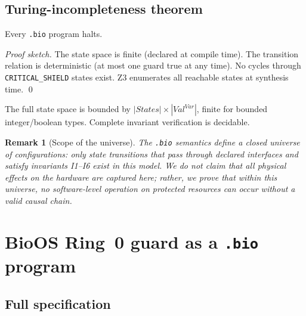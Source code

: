 \documentclass[11pt,a4paper,twoside]{article}
\newcommand{\tm}[1]{\texttt{#1}}
\newtheorem*{remark}{Remark}
\begin{document}
\subsection{Turing-incompleteness theorem}

\begin{theorem}[Termination]\label{thm:termination}
Every \texttt{.bio} program halts.
\end{theorem}
\begin{proof}[Proof sketch]
The state space is finite (declared at compile time). The transition relation is
deterministic (at most one guard true at any time). No cycles through
\tm{CRITICAL\_SHIELD} states exist. Z3 enumerates all reachable states at
synthesis time. \qed
\end{proof}

\begin{corollary}
The full state space is bounded by $|\textit{States}|\times|\textit{Val}^{\textit{Var}}|$,
finite for bounded integer/boolean types. Complete invariant verification is decidable.
\end{corollary}

\begin{remark}[Scope of the universe]
The \texttt{.bio} semantics define a closed universe of configurations: only state
transitions that pass through declared interfaces and satisfy invariants I1--I6 exist
in this model. We do not claim that all physical effects on the hardware are captured
here; rather, we prove that within this universe, no software-level operation on
protected resources can occur without a valid causal chain.
\end{remark}

\section{BioOS Ring~0 guard as a \texttt{.bio} program}

\subsection{Full specification}
\end{document}
